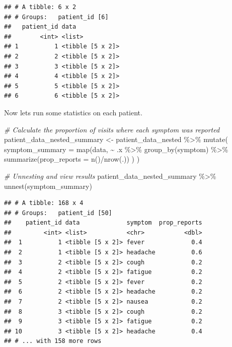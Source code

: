 \documentclass[
]{book}
\newenvironment{Shaded}{\begin{snugshade}}{\end{snugshade}}
\newcommand{\AttributeTok}[1]{\textcolor[rgb]{0.77,0.63,0.00}{#1}}
\newcommand{\CommentTok}[1]{\textcolor[rgb]{0.56,0.35,0.01}{\textit{#1}}}
\newcommand{\FunctionTok}[1]{\textcolor[rgb]{0.00,0.00,0.00}{#1}}
\newcommand{\NormalTok}[1]{#1}
\newcommand{\OtherTok}[1]{\textcolor[rgb]{0.56,0.35,0.01}{#1}}
\newcommand{\SpecialCharTok}[1]{\textcolor[rgb]{0.00,0.00,0.00}{#1}}
\begin{document}
\begin{verbatim}
## # A tibble: 6 x 2
## # Groups:   patient_id [6]
##   patient_id data            
##        <int> <list>          
## 1          1 <tibble [5 x 2]>
## 2          2 <tibble [5 x 2]>
## 3          3 <tibble [5 x 2]>
## 4          4 <tibble [5 x 2]>
## 5          5 <tibble [5 x 2]>
## 6          6 <tibble [5 x 2]>
\end{verbatim}

Now lets run some statistics on each patient.

\begin{Shaded}
\begin{Highlighting}[]
\CommentTok{\# Calculate the proportion of visits where each symptom was reported}
\NormalTok{patient\_data\_nested\_summary }\OtherTok{\textless{}{-}}\NormalTok{ patient\_data\_nested }\SpecialCharTok{\%\textgreater{}\%} 
  \FunctionTok{mutate}\NormalTok{(}
    \AttributeTok{symptom\_summary =} \FunctionTok{map}\NormalTok{(data, }\SpecialCharTok{\textasciitilde{}}\NormalTok{ .x }\SpecialCharTok{\%\textgreater{}\%} 
      \FunctionTok{group\_by}\NormalTok{(symptom) }\SpecialCharTok{\%\textgreater{}\%} 
      \FunctionTok{summarize}\NormalTok{(}\AttributeTok{prop\_reports =} \FunctionTok{n}\NormalTok{()}\SpecialCharTok{/}\FunctionTok{nrow}\NormalTok{(.))}
\NormalTok{    )}
\NormalTok{  )}

\CommentTok{\# Unnesting and view results}
\NormalTok{patient\_data\_nested\_summary }\SpecialCharTok{\%\textgreater{}\%} 
  \FunctionTok{unnest}\NormalTok{(symptom\_summary)}
\end{Highlighting}
\end{Shaded}

\begin{verbatim}
## # A tibble: 168 x 4
## # Groups:   patient_id [50]
##    patient_id data             symptom  prop_reports
##         <int> <list>           <chr>           <dbl>
##  1          1 <tibble [5 x 2]> fever             0.4
##  2          1 <tibble [5 x 2]> headache          0.6
##  3          2 <tibble [5 x 2]> cough             0.2
##  4          2 <tibble [5 x 2]> fatigue           0.2
##  5          2 <tibble [5 x 2]> fever             0.2
##  6          2 <tibble [5 x 2]> headache          0.2
##  7          2 <tibble [5 x 2]> nausea            0.2
##  8          3 <tibble [5 x 2]> cough             0.2
##  9          3 <tibble [5 x 2]> fatigue           0.2
## 10          3 <tibble [5 x 2]> headache          0.4
## # ... with 158 more rows
\end{verbatim}
\end{document}
